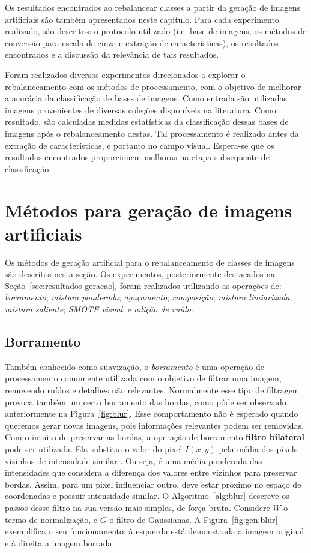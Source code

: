 Os resultados encontrados ao rebalancear classes a partir da geração de imagens artificiais são também apresentados neste capítulo. Para cada experimento realizado, são descritos: o protocolo utilizado (i.e. base de imagens, os métodos de conversão para escala de cinza e extração de características), os resultados encontrados e a discussão da relevância de tais resultados.

Foram realizados diversos experimentos direcionados a explorar o rebalanceamento com os métodos de processamento, com o objetivo de melhorar a acurácia da classificação de bases de imagens. Como entrada são utilizadas imagens provenientes de diversas coleções disponíveis na literatura. Como resultado, são calculadas medidas estatísticas da classificação dessas bases de imagens após o rebalanceamento destas. Tal processamento é realizado antes da extração de características, e portanto no campo visual. Espera-se que os resultados encontrados proporcionem melhoras na etapa subsequente de classificação.

\section{Métodos para geração de imagens artificiais}

Os métodos de geração artificial para o rebalanceamento de classes de imagens são descritos nesta seção. Os experimentos, posteriormente destacados na Seção~\ref{sec:resultados-geracao}, foram realizados utilizando as operações de: \emph{borramento}; \emph{mistura ponderada}; \textit{aguçamento}; \emph{composição}; \emph{mistura limiarizada}; \emph{mistura saliente}; \emph{SMOTE visual}; e \emph{adição de ruído}.

\subsection{Borramento}

Também conhecido como suavização, o \emph{borramento} é uma operação de processamento comumente utilizada com o objetivo de filtrar uma imagem, removendo ruídos e detalhes não relevantes. Normalmente esse tipo de filtragem provoca também um certo borramento das bordas, como pôde ser observado anteriormente na Figura~\ref{fig:blur}. Esse comportamento não é esperado quando queremos gerar novas imagens, pois informações relevantes podem ser removidas. Com o intuito de preservar as bordas, a operação de borramento \textbf{filtro bilateral} pode ser utilizada. Ela substitui o valor do pixel $I(x,y)$ pela média dos pixels vizinhos de intensidade similar \cite{Tomasi1998}. Ou seja, é uma média ponderada das intensidades que considera a diferença dos valores entre vizinhos para preservar bordas. Assim, para um pixel influenciar outro, deve estar próximo no espaço de coordenadas e possuir intensidade similar. O Algoritmo~\ref{alg:blur} descreve os passos desse filtro na sua versão mais simples, de força bruta. Considere $W$ o termo de normalização, e $G$ o filtro de Gaussianas. A Figura~\ref{fig:gen:blur} exemplifica o seu funcionamento: à esquerda está demonstrada a imagem original e à direita a imagem borrada.

